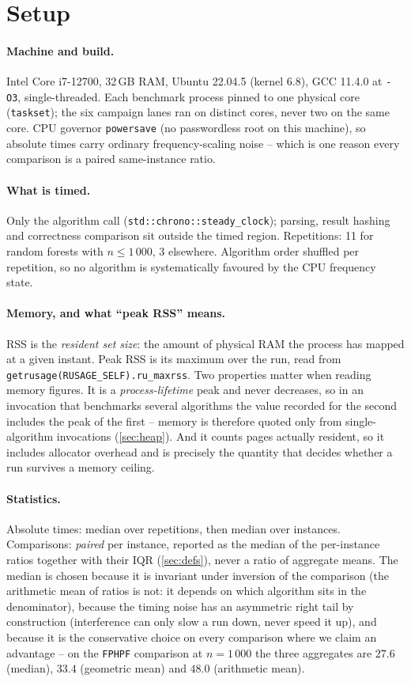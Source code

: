 \documentclass[11pt]{article}
\begin{document}
\section{Setup}\label{sec:setup}

\paragraph{Machine and build.} Intel Core i7-12700, 32\,GB RAM, Ubuntu
22.04.5 (kernel 6.8), GCC 11.4.0 at \texttt{-O3}, single-threaded. Each
benchmark process pinned to one physical core (\texttt{taskset}); the six
campaign lanes ran on distinct cores, never two on the same core. CPU
governor \texttt{powersave} (no passwordless root on this machine), so
absolute times carry ordinary frequency-scaling noise -- which is one reason
every comparison is a paired same-instance ratio.

\paragraph{What is timed.} Only the algorithm call
(\texttt{std::chrono::steady\_clock}); parsing, result hashing and correctness
comparison sit outside the timed region. Repetitions: 11 for random forests
with $n\le1\,000$, 3 elsewhere. Algorithm order shuffled per repetition, so no
algorithm is systematically favoured by the CPU frequency state.

\paragraph{Memory, and what ``peak RSS'' means.} RSS is the \emph{resident set
size}: the amount of physical RAM the process has mapped at a given instant.
Peak RSS is its maximum over the run, read from
\texttt{getrusage(RUSAGE\_SELF).ru\_maxrss}. Two properties matter when
reading memory figures. It is a \emph{process-lifetime} peak and never
decreases, so in an invocation that benchmarks several algorithms the value
recorded for the second includes the peak of the first -- memory is therefore
quoted only from single-algorithm invocations (\cref{sec:heap}). And it counts
pages actually resident, so it includes allocator overhead and is precisely
the quantity that decides whether a run survives a memory ceiling.

\paragraph{Statistics.} Absolute times: median over repetitions, then median
over instances. Comparisons: \emph{paired} per instance, reported as the
median of the per-instance ratios together with their IQR
(\cref{sec:defs}), never a ratio of aggregate means.
The median is chosen because it is invariant under inversion of the comparison
(the arithmetic mean of ratios is not: it depends on which algorithm sits in
the denominator), because the timing noise has an asymmetric right tail by
construction (interference can only slow a run down, never speed it up), and
because it is the conservative choice on every comparison where we claim an
advantage -- on the \texttt{FPHPF} comparison at $n=1\,000$ the three
aggregates are $27.6$ (median), $33.4$ (geometric mean) and $48.0$ (arithmetic
mean).
\end{document}
